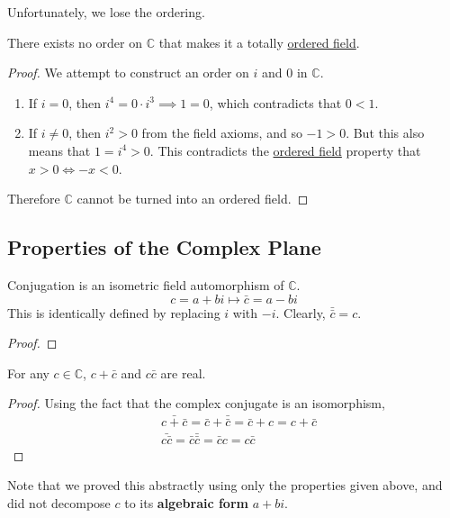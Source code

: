   Unfortunately, we lose the ordering. 

  \begin{theorem}
    \label{thm:order-on-complex-plane}
    There exists no order on $\mathbb{C}$ that makes it a totally \hyperref[alg-def:ordered-field]{ordered field}.
  \end{theorem}
  \begin{proof}
    We attempt to construct an order on $i$ and $0$ in $\mathbb{C}$. 
    \begin{enumerate}
      \item If $i = 0$, then $i^4 = 0 \cdot i^3 \implies 1 = 0$, which contradicts that $0 < 1$. 
      \item If $i \neq 0$, then $i^2 > 0$ from the field axioms, and so $-1 > 0$. But this also means that $1 = i^4 > 0$. This contradicts the \hyperref[alg-def:ordered-field]{ordered field} property that $x > 0 \iff -x < 0$. 
    \end{enumerate}
    Therefore $\mathbb{C}$ cannot be turned into an ordered field. 
  \end{proof}

\subsection{Properties of the Complex Plane}

  \begin{theorem}
    \label{thm:conjugation-is-an-isomorphism}
    Conjugation is an isometric field automorphism of $\mathbb{C}$. 
    \begin{equation}
      c = a + b i \mapsto \bar{c} = a - b i
    \end{equation}
    This is identically defined by replacing $i$ with $-i$. Clearly, $\bar{\bar{c}} = c$. 
  \end{theorem}
  \begin{proof}
    
  \end{proof}

  \begin{theorem}
    \label{thm:properties-of-conjugation}
    For any $c \in \mathbb{C}$, $c + \bar{c}$ and $c \bar{c}$ are real. 
  \end{theorem}
  \begin{proof}
    Using the fact that the complex conjugate is an isomorphism, 
    \begin{align*}
      & \bar{c + \bar{c}} = \bar{c} + \bar{\bar{c}} = \bar{c} + c = c + \bar{c} \\
      & \bar{ c \bar{c}} = \bar{c} \bar{\bar{c}} = \bar{c} c = c \bar{c}
    \end{align*}
  \end{proof}
  Note that we proved this abstractly using only the properties given above, and did not decompose $c$ to its \textbf{algebraic form} $a + b i$. 

